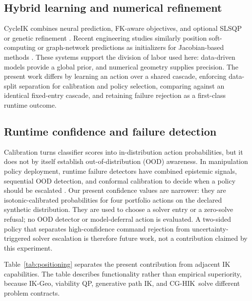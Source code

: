 \documentclass[10pt,a4paper]{article}
\newcommand{\method}{CG-HIK}
\begin{document}
\subsection{Hybrid learning and numerical refinement}

CycleIK combines neural prediction, FK-aware objectives, and optional SLSQP or genetic
refinement \cite{habekost2023cycleik}. Recent engineering studies similarly position
soft-computing or graph-network predictions as initializers for Jacobian-based methods
\cite{jayabalan2026hybrid,jlidi2026xgnn}. These systems support the division of labor
used here: data-driven models provide a global prior, and numerical geometry supplies
precision. The present work differs by learning an action over a shared cascade,
enforcing data-split separation for calibration and policy selection, comparing against
an identical fixed-entry cascade, and retaining failure rejection as a first-class
runtime outcome.

\subsection{Runtime confidence and failure detection}

Calibration turns classifier scores into in-distribution action probabilities, but it
does not by itself establish out-of-distribution (OOD) awareness. In manipulation
policy deployment, runtime failure detectors have combined epistemic signals,
sequential OOD detection, and conformal calibration to decide when a policy should be
escalated \cite{xu2025faildetect}. Our present confidence values are narrower: they are
isotonic-calibrated probabilities for four portfolio actions on the declared synthetic
distribution. They are used to choose a solver entry or a zero-solve refusal; no OOD
detector or model-deferral action is evaluated. A two-sided policy that separates
high-confidence command rejection from uncertainty-triggered solver escalation is
therefore future work, not a contribution claimed by this experiment.

Table~\ref{tab:positioning} separates the present contribution from adjacent IK
capabilities. The table describes functionality rather than empirical superiority,
because IK-Geo, viability QP, generative path IK, and \method\ solve different problem
contracts.
\end{document}

